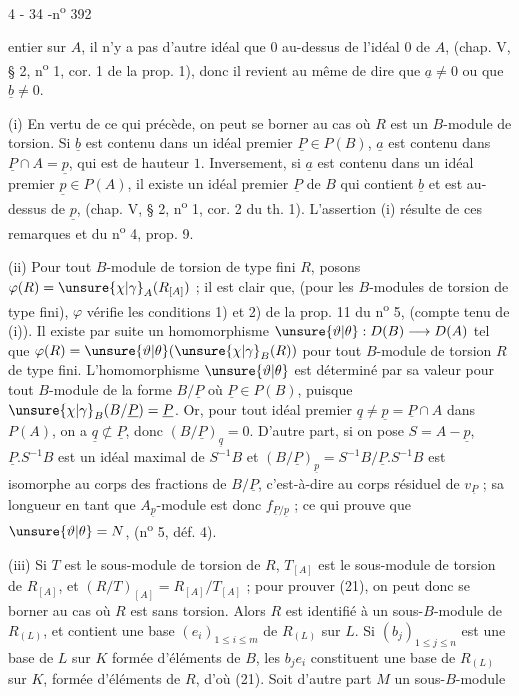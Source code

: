 \begin{center}4 - 34 -\hfill n\textsuperscript{o} 392\end{center}

entier sur $A$, il n'y a pas d'autre idéal que $0$ au-dessus de l'idéal $0$ de $A$, (chap. V, § 2, n\textsuperscript{o} 1, cor. 1 de la prop. 1), donc il revient au même de dire que $\underline{a}\ne0$ ou que $\underline{b}\ne0$.

(i) En vertu de ce qui précède, on peut se borner au cas où $R$ est un $B$-module de torsion. Si $\underline{b}$ est contenu dans un idéal premier $\underline{P}\in P(B)$, $\underline{a}$ est contenu dans $\underline{P}\cap A=\underline{p}$, qui est de hauteur $1$. Inversement, si $\underline{a}$ est contenu dans un idéal premier $\underline{p}\in P(A)$, il existe un idéal premier $\underline{P}$ de $B$ qui contient $\underline{b}$ et est au-dessus de $\underline{p}$, (chap. V, § 2, n\textsuperscript{o} 1, cor. 2 du th. 1). L'assertion (i) résulte de ces remarques et du n\textsuperscript{o} 4, prop. 9.

(ii) Pour tout $B$-module de torsion de type fini $R$, posons $\varphi(R)=\unsure{\chi|\gamma}_A(R_{[A]})$ ; il est clair que, (pour les $B$-modules de torsion de type fini), $\varphi$ vérifie les conditions 1) et 2) de la prop. 11 du n\textsuperscript{o} 5, (compte tenu de (i)). Il existe par suite un homomorphisme $\unsure{\vartheta|\theta}:D(B)\longrightarrow D(A)$ tel que $\varphi(R)=\unsure{\vartheta|\theta}(\unsure{\chi|\gamma}_B(R))$ pour tout $B$-module de torsion $R$ de type fini. L'homomorphisme $\unsure{\vartheta|\theta}$ est déterminé par sa valeur pour tout $B$-module de la forme $B/\underline{P}$ où $\underline{P}\in P(B)$, puisque $\unsure{\chi|\gamma}_B(B/\underline{P})=\underline{P}$. Or, pour tout idéal premier $\underline{q}\ne\underline{p}=\underline{P}\cap A$ dans $P(A)$, on a $\underline{q}\not\subset\underline{P}$, donc $(B/\underline{P})_{\underline{q}}=0$. D'autre part, si on pose $S=A-\underline{p}$, $\underline{P}.S^{-1}B$ est un idéal maximal de $S^{-1}B$ et $(B/\underline{P})_{\underline{p}}=S^{-1}B/\underline{P}.S^{-1}B$ est isomorphe au corps des fractions de $B/\underline{P}$, c'est-à-dire au corps résiduel de $v_{\underline{P}}$ ; sa longueur en tant que $A_{\underline{p}}$-module est donc $f_{\underline{P}/\underline{p}}$ ; ce qui prouve que $\unsure{\vartheta|\theta}=N$, (n\textsuperscript{o} 5, déf. 4).

(iii) Si $T$ est le sous-module de torsion de $R$, $T_{[A]}$ est le sous-module de torsion de $R_{[A]}$, et $(R/T)_{[A]}=R_{[A]}/T_{[A]}$ ; pour prouver (21), on peut donc se borner au cas où $R$ est sans torsion. Alors $R$ est identifié à un sous-$B$-module de $R_{(L)}$, et contient une base $(e_i)_{1\le i\le m}$ de $R_{(L)}$ sur $L$. Si $(b_j)_{1\le j\le n}$ est une base de $L$ sur $K$ formée d'éléments de $B$, les $b_je_i$ constituent une base de $R_{(L)}$ sur $K$, formée d'éléments de $R$, d'où (21). Soit d'autre part $M$ un sous-$B$-module

